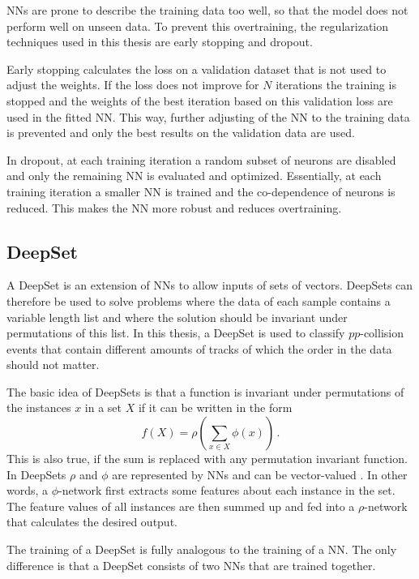 NNs are prone to describe the training data too well, so that the model does not perform well on unseen data.
To prevent this overtraining, the regularization techniques used in this thesis are early stopping and dropout.

Early stopping calculates the loss on a validation dataset that is not used to adjust the weights.
If the loss does not improve for $N$ iterations the training is stopped and the weights of the best iteration based on this validation loss are used in the fitted NN.
This way, further adjusting of the NN to the training data is prevented and only the best results on the validation data are used.

In dropout, at each training iteration a random subset of neurons are disabled and only the remaining NN is evaluated and optimized.
Essentially, at each training iteration a smaller NN is trained and the co-dependence of neurons is reduced.
This makes the NN more robust and reduces overtraining.

\subsection{DeepSet}
\label{sec:DeepSet}

A DeepSet\cite{deepset} is an extension of NNs to allow inputs of sets of vectors.
DeepSets can therefore be used to solve problems where the data of each sample contains a variable length list and where the solution should be invariant under permutations of this list.
In this thesis, a DeepSet is used to classify $pp$-collision events that contain different amounts of tracks of which the order in the data should not matter.

The basic idea of DeepSets is that a function is invariant under permutations of the instances $x$ in a set $X$ if it can be written in the form %
\begin{equation*}
    f(X) = \rho \left( \sum_{x \in X} \phi (x) \right) \, .
\end{equation*}
This is also true, if the sum is replaced with any permutation invariant function.
In DeepSets $\rho$ and $\phi$ are represented by NNs and can be vector-valued \cite{deepset}.
In other words, a $\phi$-network first extracts some features about each instance in the set.
The feature values of all instances are then summed up and fed into a $\rho$-network that calculates the desired output.

The training of a DeepSet is fully analogous to the training of a NN.
The only difference is that a DeepSet consists of two NNs that are trained together.




